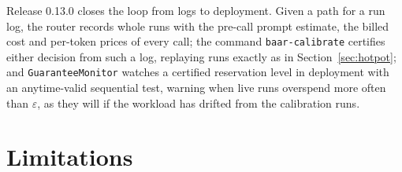 \documentclass[11pt]{article}
\theoremstyle{remark}
\begin{document}
Release 0.13.0 closes the loop from logs to deployment. Given a path for a run
log, the router records whole runs with the pre-call prompt estimate, the
billed cost and per-token prices of every call; the command
\texttt{baar-calibrate} certifies either decision from such a log, replaying
runs exactly as in Section~\ref{sec:hotpot}; and \texttt{GuaranteeMonitor}
watches a certified reservation level in deployment with an anytime-valid
sequential test, warning when live runs overspend more often than
$\varepsilon$, as they will if the workload has drifted from the calibration
runs.

\section{Limitations}
\end{document}
